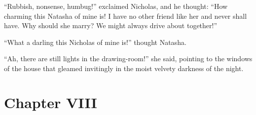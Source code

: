 ``Rubbish, nonsense, humbug!'' exclaimed Nicholas, and he
thought: ``How charming this Natasha of mine is! I have no other
friend like her and never shall have. Why should she marry? We
might always drive about together!''

``What a darling this Nicholas of mine is!'' thought Natasha.

``Ah, there are still lights in the drawing-room!'' she said,
pointing to the windows of the house that gleamed invitingly in
the moist velvety darkness of the night.


\chapter*{Chapter VIII}
\ifaudio     
{} 
\fi

